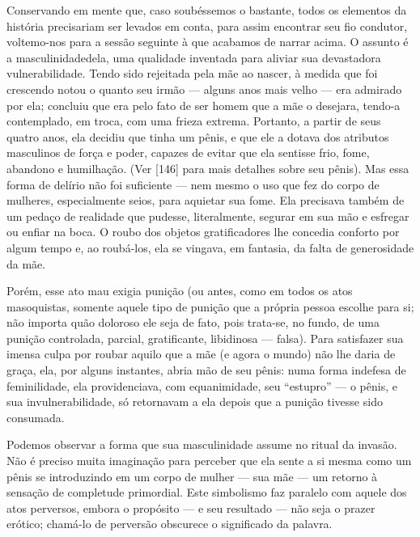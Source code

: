 Conservando em mente que, caso soubéssemos o bastante, todos os
elementos da história precisariam ser levados em conta, para assim
encontrar seu fio condutor, voltemo-nos para a sessão seguinte à que
acabamos de narrar acima. O assunto é a masculinidade\idxmasc[|(] dela, uma
qualidade inventada para aliviar sua devastadora vulnerabilidade. Tendo
sido rejeitada pela mãe ao nascer, à medida que foi crescendo notou o
quanto seu irmão --- alguns anos mais velho --- era admirado por
ela; concluiu que era pelo fato de ser homem que a mãe o desejara,
tendo-a contemplado, em troca, com uma frieza extrema. Portanto, a
partir de seus quatro anos, ela decidiu que tinha um pênis,\idxpenisimag{} e que ele a
dotava dos atributos masculinos de força e poder, capazes de evitar
que ela sentisse frio, fome, abandono e humilhação. (Ver [146] para
mais detalhes sobre seu pênis). Mas essa forma de delírio não foi
suficiente --- nem mesmo o uso que fez do corpo de mulheres,
especialmente seios,\idxseios{} para aquietar sua fome. Ela precisava também de um
pedaço de realidade que pudesse, literalmente, segurar em sua mão e
esfregar ou enfiar na boca. O roubo dos objetos gratificadores lhe
concedia conforto por algum tempo e, ao roubá-los, ela se vingava, em
fantasia, da falta de generosidade da mãe.

Porém, esse ato mau exigia punição\idxmasoqpun{} (ou antes, como em todos os atos
masoquistas, somente aquele tipo de punição que a própria pessoa
escolhe para si; não importa quão doloroso ele seja de fato, pois
trata-se, no fundo, de uma punição controlada, parcial, gratificante,
libidinosa --- falsa). Para satisfazer sua imensa culpa por roubar
aquilo que a mãe (e agora o mundo) não lhe daria de graça, ela, por
alguns instantes, abria mão de seu pênis: numa forma indefesa de
feminilidade, ela providenciava, com equanimidade, seu
``estupro'' --- o pênis, e sua
invulnerabilidade, só retornavam a ela depois que a punição tivesse
sido consumada.

Podemos observar a forma que sua masculinidade assume no ritual da
invasão. Não é preciso muita imaginação para perceber que ela sente a
si mesma como um pênis se introduzindo em um corpo de mulher --- sua
mãe --- um retorno à sensação de completude primordial. Este
simbolismo\idxpervsimbo{} faz paralelo com aquele dos atos perversos, embora o
propósito --- e seu resultado --- não seja o prazer erótico;
chamá-lo de perversão obscurece o significado da palavra.


\bigskip

